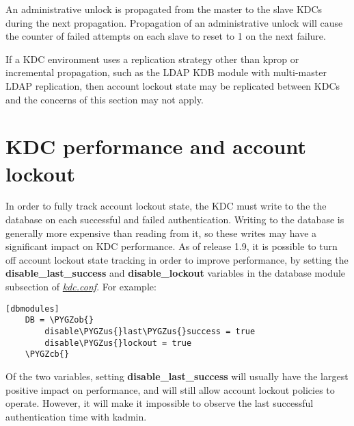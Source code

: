 \documentclass[letterpaper,10pt,english]{sphinxmanual}
\def\PYGZus{\char`\_}
\def\PYGZob{\char`\{}
\def\PYGZcb{\char`\}}
\begin{document}
An administrative unlock is propagated from the master to the slave
KDCs during the next propagation.  Propagation of an administrative
unlock will cause the counter of failed attempts on each slave to
reset to 1 on the next failure.

If a KDC environment uses a replication strategy other than kprop or
incremental propagation, such as the LDAP KDB module with multi-master
LDAP replication, then account lockout state may be replicated between
KDCs and the concerns of this section may not apply.


\section{KDC performance and account lockout}
\label{admin/lockout:kdc-performance-and-account-lockout}
In order to fully track account lockout state, the KDC must write to
the the database on each successful and failed authentication.
Writing to the database is generally more expensive than reading from
it, so these writes may have a significant impact on KDC performance.
As of release 1.9, it is possible to turn off account lockout state
tracking in order to improve performance, by setting the
\textbf{disable\_last\_success} and \textbf{disable\_lockout} variables in the
database module subsection of {\hyperref[admin/conf_files/kdc_conf:kdc-conf-5]{\emph{kdc.conf}}}.  For example:

\begin{Verbatim}[commandchars=\\\{\}]
[dbmodules]
    DB = \PYGZob{}
        disable\PYGZus{}last\PYGZus{}success = true
        disable\PYGZus{}lockout = true
    \PYGZcb{}
\end{Verbatim}

Of the two variables, setting \textbf{disable\_last\_success} will usually
have the largest positive impact on performance, and will still allow
account lockout policies to operate.  However, it will make it
impossible to observe the last successful authentication time with
kadmin.
\end{document}
